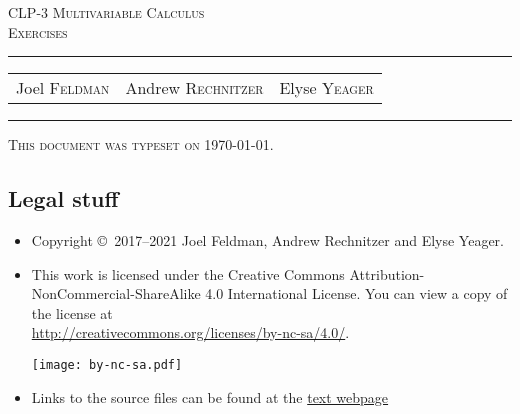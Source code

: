 \documentclass[12pt,a4paper, openany]{book}
\makeatletter
\newcommand{\reqnomode}{\tagsleft@false}
\makeatother
\begin{document}
\reqnomode

\setcounter{page}{0}

\begin{titlepage}
\begin{center}
\textsc{\LARGE
CLP-3 Multivariable Calculus\\[2ex]
Exercises
}\\[2ex]

\vspace{5ex}
\hrule
\vspace{5ex}

\begin{tabular}{ccc}
\large  Joel \textsc{Feldman}
& \large \qquad Andrew \textsc{Rechnitzer}
&\large  \qquad Elyse \textsc{Yeager}
\end{tabular}

\end{center}
\vspace{2ex}
\hrule

\vfill
\textsc{This document was typeset on \today.}
\end{titlepage}

\subsection*{Legal stuff}
\begin{itemize}
 \item Copyright \copyright\ 2017--2021 Joel Feldman, Andrew Rechnitzer and Elyse Yeager.
\item This work is licensed under the
Creative Commons Attribution-NonCommercial-ShareAlike 4.0 International
License. You can view a copy of the license at \\
\url{http://creativecommons.org/licenses/by-nc-sa/4.0/}.
\begin{center}
 \texttt{[image: by-nc-sa.pdf]}
\end{center}
\item Links to the source files can be found at the \href{http://www.math.ubc.ca/~CLP/index.html}{text webpage}
\end{itemize}
\newpage
\end{document}
